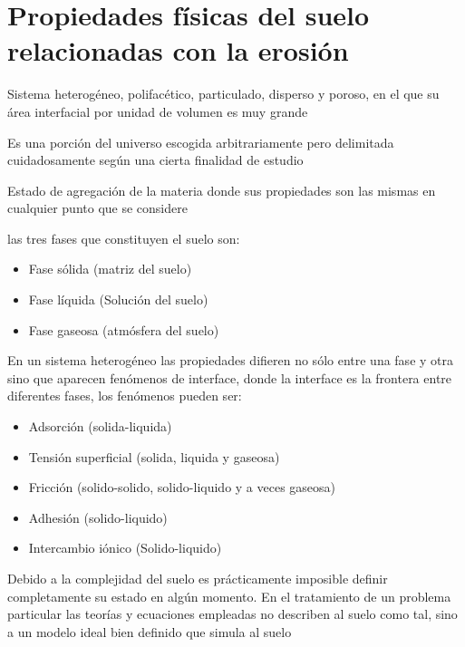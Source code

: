 \section{Propiedades físicas del suelo relacionadas con la erosión}
\begin{definition}[Suelo]
    Sistema heterogéneo, polifacético, particulado, disperso y poroso, en el que su área interfacial por unidad de volumen es muy grande
\end{definition}
\begin{definition}[Sistema]
    Es una porción del universo escogida arbitrariamente pero delimitada cuidadosamente según una cierta finalidad de estudio
\end{definition}
\begin{definition}[Fase]
    Estado de agregación de la materia donde sus propiedades son las mismas en cualquier punto que se considere
\end{definition}
las tres fases que constituyen el suelo son:
\begin{itemize}
    \item Fase sólida (matriz del suelo)
    \item Fase líquida (Solución del suelo)
    \item Fase gaseosa (atmósfera del suelo)
\end{itemize}
\begin{definition}[Interfaces]
    En un sistema heterogéneo las propiedades difieren no sólo entre una fase y otra sino que aparecen fenómenos de interface, donde la interface es la frontera entre diferentes fases, los fenómenos pueden ser:
    \begin{itemize}
        \item Adsorción (solida-liquida)
        \item Tensión superficial (solida, liquida y gaseosa)
        \item Fricción (solido-solido, solido-liquido y a veces gaseosa)
        \item Adhesión (solido-liquido)
        \item Intercambio iónico (Solido-liquido)
    \end{itemize}
\end{definition}

Debido a la complejidad del suelo es prácticamente imposible definir completamente su estado en algún momento. En el tratamiento de un problema particular las teorías y ecuaciones empleadas no describen al suelo como tal, sino a un modelo ideal bien definido que simula al suelo



